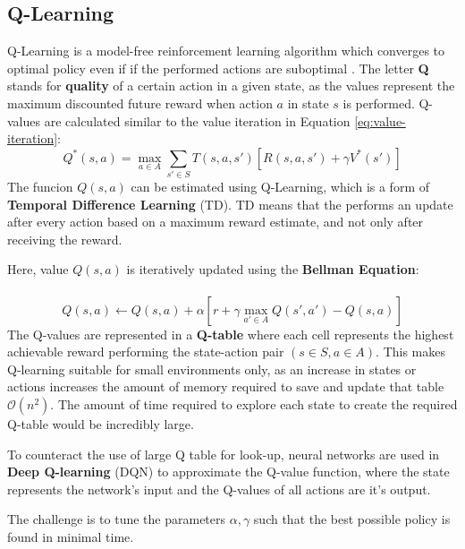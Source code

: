 \documentclass[a4paper]{article}
\begin{document}
	\subsection{Q-Learning}\label{sec:qlearn}
	Q-Learning is a model-free reinforcement learning algorithm which converges to optimal policy even if if the performed actions are suboptimal \citep{Lecture}. The letter \textbf{Q} stands for \textbf{quality} of a certain action in a given state, as the values represent the maximum discounted future reward when action $a$ in state $s$ is performed. Q-values are calculated similar to the value iteration in Equation \ref{eq:value-iteration}:
	\begin{equation}\label{eq:qlearn}
	Q^*(s,a) = \max_{a \in A} \sum_{s' \in S}^{} T(s,a,s')[R(s,a,s')+\gamma V^*(s')]
	\end{equation}
	The funcion $Q(s,a)$ can be estimated using Q-Learning, which is a form of \textbf{Temporal Difference Learning} (TD). TD means that the performs an update after every action based on a maximum reward estimate, and not only after receiving the reward.
	\par  Here, value $Q(s,a)$ is iteratively updated using the \textbf{Bellman Equation}: \\\\
	\begin{equation}\label{eq:qupdate}
	Q(s,a) \leftarrow Q(s,a) + \alpha [r + \gamma \max_{a' \in A}Q(s',a')-Q(s,a)]
	\end{equation}
	The Q-values are represented in a \textbf{Q-table} where each cell represents the highest achievable reward performing the state-action pair $(s\in S, a\in A)$. This makes Q-learning suitable for small environments only, as an increase in states or actions increases the amount of memory required to save and update that table $\mathcal{O}(n^2)$. The amount of time required to explore each state to create the required Q-table would be incredibly large.
	\par To counteract the use of large Q table for look-up, neural networks are used in \textbf{Deep Q-learning} (DQN) to approximate the Q-value function, where the state represents the network's input and the Q-values of all actions are it's output.
	\par The challenge is to tune the parameters $\alpha , \gamma$ such that the best possible policy is found in minimal time.
\end{document}
